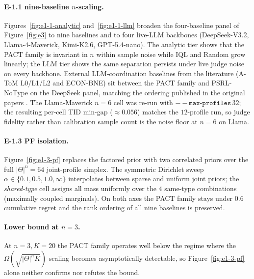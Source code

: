\paragraph{E-1.1 nine-baseline $n$-scaling.} Figures~\ref{fig:e1-1-analytic} and~\ref{fig:e1-1-llm} broaden the four-baseline panel of Figure~\ref{fig:e3} to nine baselines and to four live-LLM backbones (DeepSeek-V3.2, Llama-4-Maverick, Kimi-K2.6, GPT-5.4-nano). The analytic tier shows that the PACT family is invariant in $n$ within sample noise while IQL and Random grow linearly; the LLM tier shows the same separation persists under live judge noise on every backbone. External LLM-coordination baselines from the literature (A-ToM L0/L1/L2 and ECON-BNE) sit between the PACT family and PSRL-NoType on the DeepSeek panel, matching the ordering published in the original papers \citep{mu2026adaptive,xie2025debate}. The Llama-Maverick $n{=}6$ cell was re-run with $\mathtt{--max\text{-}profiles}\,32$; the resulting per-cell TID min-gap ($\approx 0.056$) matches the $12$-profile run, so judge fidelity rather than calibration sample count is the noise floor at $n{=}6$ on Llama.

\paragraph{E-1.3 PF isolation.} Figure~\ref{fig:e1-3-pf} replaces the factored prior with two correlated priors over the full $|\Theta|^n{=}64$ joint-profile simplex. The symmetric Dirichlet sweep $\alpha\in\{0.1, 0.5, 1.0, \infty\}$ interpolates between sparse and uniform joint priors; the \emph{shared-type} cell assigns all mass uniformly over the $4$ same-type combinations (maximally coupled marginals). On both axes the PACT family stays under $0.6$ cumulative regret and the rank ordering of all nine baselines is preserved.

\paragraph{Lower bound at $n{=}3$.} At $n{=}3, K{=}20$ the PACT family operates well below the regime where the $\Omega(\sqrt{|\Theta|^n K})$ scaling becomes asymptotically detectable, so Figure~\ref{fig:e1-3-pf} alone neither confirms nor refutes the bound.


